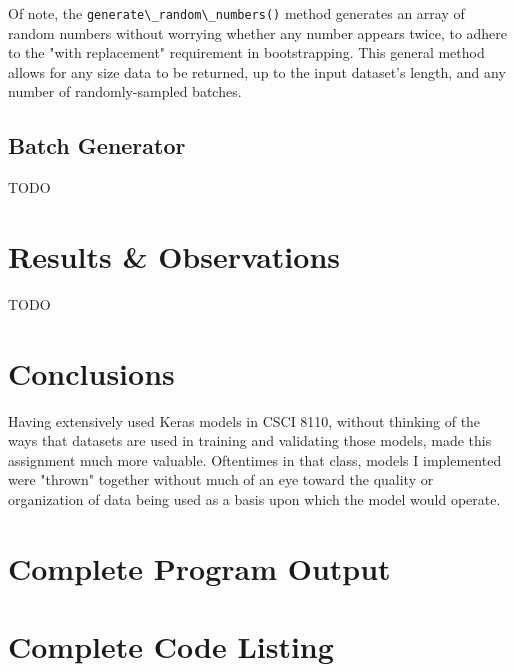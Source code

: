 \documentclass{article}
\begin{document}
Of note, the \lstinline{generate\_random\_numbers()} method generates an array of random numbers without worrying whether any number appears twice, to adhere to the "with replacement" requirement in bootstrapping.
This general method allows for any size data to be returned, up to the input dataset's length, and any number of randomly-sampled batches.

\subsection{Batch Generator}
TODO

\section{Results \& Observations} \label{observations}
TODO
\section{Conclusions}
Having extensively used Keras models in CSCI 8110, without thinking of the ways that datasets are used in training and validating those models, made this assignment much more valuable.
Oftentimes in that class, models I implemented were "thrown" together without much of an eye toward the quality or organization of data being used as a basis upon which the model would operate.

\newpage
\begin{appendices}
\section{Complete Program Output} \label{completeout}

\section{Complete Code Listing} \label{codelist}

\end{appendices}
\end{document}
